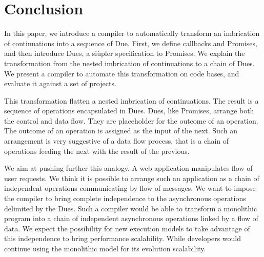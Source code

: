 \section{Conclusion} \label{section:conclusion}

In this paper, we introduce a compiler to automatically transform an imbrication of continuations into a sequence of Due.
First, we define callbacks and Promises, and then introduce Dues, a siùpler specification to Promises.
We explain the transformation from the nested imbrication of continuations to a chain of Dues.
We present a compiler to automate this transformation on code bases, and evaluate it against a set of projects.


This transformation flatten a nested imbrication of continuations.
The result is a sequence of operations encapsulated in Dues.
Dues, like Promises, arrange both the control and data flow.
They are placeholder for the outcome of an operation.
The outcome of an operation is assigned as the input of the next.
Such an arrangement is very suggestive of a data flow process, that is a chain of operations feeding the next with the result of the previous.

We aim at pushing further this analogy.
A web application manipulates flow of user requests.
We think it is possible to arrange such an application as a chain of independent operations communicating by flow of messages.
We want to impose the compiler to bring complete independence to the asynchronous operations delimited by the Dues.
Such a compiler would be able to transform a monolithic program into a chain of independent asynchronous operations linked by a flow of data.
We expect the possibility for new execution models to take advantage of this independence to bring performance scalability.
While developers would continue using the monolithic model for its evolution scalability.